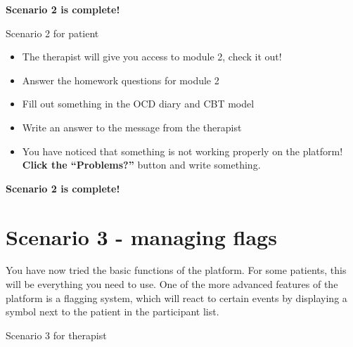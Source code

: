 \documentclass[]{book}
\providecommand{\tightlist}{%
  \setlength{\itemsep}{0pt}\setlength{\parskip}{0pt}}
\begin{document}
\textbf{Scenario 2 is complete!}

 Scenario 2 for patient

\begin{itemize}
\tightlist
\item
  The therapist will give you access to module 2, check it out!
\item
  Answer the homework questions for module 2
\item
  Fill out something in the OCD diary and CBT model
\item
  Write an answer to the message from the therapist
\item
  You have noticed that something is not working properly on the platform! \textbf{Click the ``Problems?''} button and write something.
\end{itemize}

\textbf{Scenario 2 is complete!}

\hypertarget{scenario-3---managing-flags}{%
\section{Scenario 3 - managing flags}\label{scenario-3---managing-flags}}

You have now tried the basic functions of the platform. For some patients, this will be everything you need to use. One of the more advanced features of the platform is a flagging system, which will react to certain events by displaying a symbol next to the patient in the participant list.

 Scenario 3 for therapist
\end{document}
